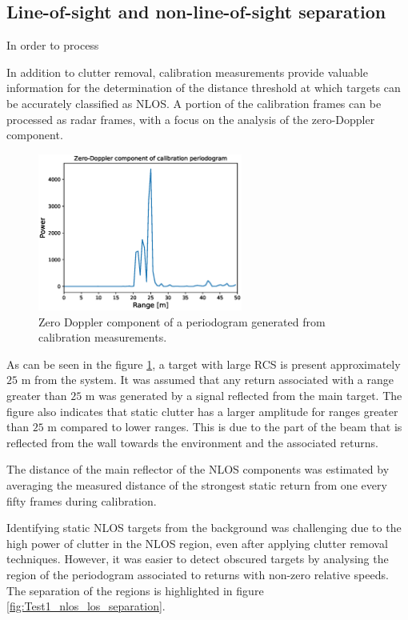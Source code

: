 \subsection{Line-of-sight and non-line-of-sight separation}

In order to process

In addition to clutter removal, calibration measurements provide valuable information for the determination of the distance threshold at which targets can be accurately classified as NLOS. A portion of the calibration frames can be processed as radar frames, with a focus on the analysis of the zero-Doppler component.
	

\begin{figure}[H]
	\centering
	\includegraphics[width=0.6\textwidth]{Images/Test1/cali_static_per_t1.eps}
	\caption{Zero Doppler component of a periodogram generated from calibration measurements.}
	\label{fig:Test1_cali_static_per}
\end{figure}

As can be seen in the figure \ref{fig:Test1_cali_static_per}, a target with large RCS is present approximately $25$ m from the system. It was assumed that any return associated with a range greater than $25$ m was generated by a signal reflected from the main target. The figure also indicates that static clutter has a larger amplitude for ranges greater than $25$ m compared to lower ranges. This is due to the part of the beam that is reflected from the wall towards the environment and the associated returns.

The distance of the main reflector of the NLOS components was estimated by averaging the measured distance of the strongest static return from one every fifty frames during calibration.

Identifying static NLOS targets from the background was challenging due to the high power of clutter in the NLOS region, even after applying clutter removal techniques. However, it was easier to detect obscured targets by analysing the region of the periodogram associated to returns with non-zero relative speeds. The separation of the regions is highlighted in figure \ref{fig:Test1_nlos_los_separation}.

